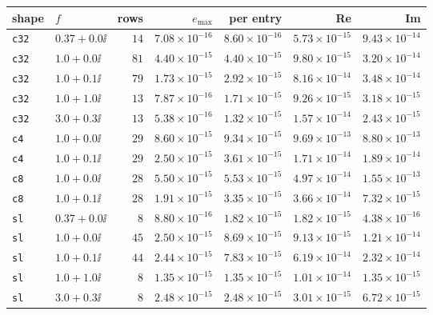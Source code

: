 \begin{tabular}{llrrrrr}
\toprule
shape & $f$ & rows & $e_{\max}$ & per entry & Re & Im \\
\midrule
\texttt{c32} & $0.37 + 0.0\ii$ & $14$ & $7.08{\times}10^{-16}$ & $8.60{\times}10^{-16}$ & $5.73{\times}10^{-15}$ & $9.43{\times}10^{-14}$ \\
\texttt{c32} & $1.0 + 0.0\ii$ & $81$ & $4.40{\times}10^{-15}$ & $4.40{\times}10^{-15}$ & $9.80{\times}10^{-15}$ & $3.20{\times}10^{-14}$ \\
\texttt{c32} & $1.0 + 0.1\ii$ & $79$ & $1.73{\times}10^{-15}$ & $2.92{\times}10^{-15}$ & $8.16{\times}10^{-14}$ & $3.48{\times}10^{-14}$ \\
\texttt{c32} & $1.0 + 1.0\ii$ & $13$ & $7.87{\times}10^{-16}$ & $1.71{\times}10^{-15}$ & $9.26{\times}10^{-15}$ & $3.18{\times}10^{-15}$ \\
\texttt{c32} & $3.0 + 0.3\ii$ & $13$ & $5.38{\times}10^{-16}$ & $1.32{\times}10^{-15}$ & $1.57{\times}10^{-14}$ & $2.43{\times}10^{-15}$ \\
\texttt{c4} & $1.0 + 0.0\ii$ & $29$ & $8.60{\times}10^{-15}$ & $9.34{\times}10^{-15}$ & $9.69{\times}10^{-13}$ & $8.80{\times}10^{-13}$ \\
\texttt{c4} & $1.0 + 0.1\ii$ & $29$ & $2.50{\times}10^{-15}$ & $3.61{\times}10^{-15}$ & $1.71{\times}10^{-14}$ & $1.89{\times}10^{-14}$ \\
\texttt{c8} & $1.0 + 0.0\ii$ & $28$ & $5.50{\times}10^{-15}$ & $5.53{\times}10^{-15}$ & $4.97{\times}10^{-14}$ & $1.55{\times}10^{-13}$ \\
\texttt{c8} & $1.0 + 0.1\ii$ & $28$ & $1.91{\times}10^{-15}$ & $3.35{\times}10^{-15}$ & $3.66{\times}10^{-14}$ & $7.32{\times}10^{-15}$ \\
\texttt{sl} & $0.37 + 0.0\ii$ & $8$ & $8.80{\times}10^{-16}$ & $1.82{\times}10^{-15}$ & $1.82{\times}10^{-15}$ & $4.38{\times}10^{-16}$ \\
\texttt{sl} & $1.0 + 0.0\ii$ & $45$ & $2.50{\times}10^{-15}$ & $8.69{\times}10^{-15}$ & $9.13{\times}10^{-15}$ & $1.21{\times}10^{-14}$ \\
\texttt{sl} & $1.0 + 0.1\ii$ & $44$ & $2.44{\times}10^{-15}$ & $7.83{\times}10^{-15}$ & $6.19{\times}10^{-14}$ & $2.32{\times}10^{-14}$ \\
\texttt{sl} & $1.0 + 1.0\ii$ & $8$ & $1.35{\times}10^{-15}$ & $1.35{\times}10^{-15}$ & $1.01{\times}10^{-14}$ & $1.35{\times}10^{-15}$ \\
\texttt{sl} & $3.0 + 0.3\ii$ & $8$ & $2.48{\times}10^{-15}$ & $2.48{\times}10^{-15}$ & $3.01{\times}10^{-15}$ & $6.72{\times}10^{-15}$ \\
\bottomrule
\end{tabular}
